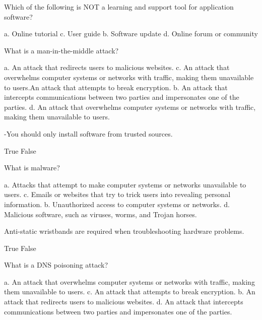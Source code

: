 \documentclass{exam}
\begin{document}
\begin{questions}

\printanswers
\question Which of the following is NOT a learning and support tool for application software?
\begin{checkboxes}
\choice a. Online tutorial
\choice c. User guide
\CorrectChoice b. Software update
\choice d. Online forum or community
\end{checkboxes}

\question What is a man-in-the-middle attack?
\begin{checkboxes}
\choice a. An attack that redirects users to malicious websites.
\choice c. An attack that overwhelms computer systems or networks with traffic, making them unavailable to users.An attack that attempts to break encryption.
\CorrectChoice b. An attack that intercepts communications between two parties and impersonates one of the parties.
\choice d. An attack that overwhelms computer systems or networks with traffic, making them unavailable to users.
\end{checkboxes}

-You should only install software from trusted sources.
\begin{checkboxes}
\CorrectChoice True
\choice False
\end{checkboxes}

\question What is malware?
\begin{checkboxes}
\choice a. Attacks that attempt to make computer systems or networks unavailable to users.
\choice c. Emails or websites that try to trick users into revealing personal information.
\choice b. Unauthorized access to computer systems or networks.
\CorrectChoice d. Malicious software, such as viruses, worms, and Trojan horses.
\end{checkboxes}

\question Anti-static wristbands are required when troubleshooting hardware problems.
\begin{checkboxes}
\choice True
\CorrectChoice False
\end{checkboxes}

\question What is a DNS poisoning attack?
\begin{checkboxes}
\choice a. An attack that overwhelms computer systems or networks with traffic, making them unavailable to users.
\choice c. An attack that attempts to break encryption.
\CorrectChoice b. An attack that redirects users to malicious websites.
\choice d. An attack that intercepts communications between two parties and impersonates one of the parties.
\end{checkboxes}


\end{questions}
\end{document}
